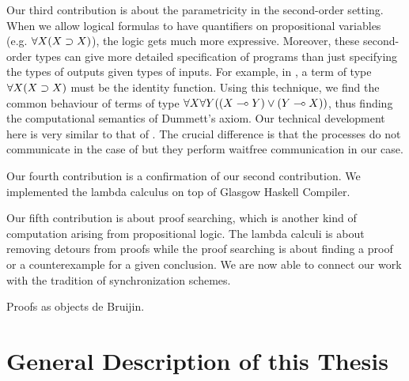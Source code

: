 Our third contribution is about the parametricity in the second-order
setting.  When we allow logical formulas to have quantifiers on
propositional variables (e.g. $\forall X(X\supset X)$), the logic gets much
more expressive.
Moreover, these second-order types can give more detailed specification
of programs than just specifying the types of outputs given types of
inputs.
For example, in , a term of type $\forall X(X\supset X)$
must be the identity function.
Using this technique, we find the common behaviour of terms of type
$\forall X \forall Y ((X\multimap Y)\lor (Y\multimap X))$, thus finding the
computational semantics of Dummett's axiom.
Our technical development here is very similar to that of
\citet{danos-krivine}.  The crucial difference is that the processes do
not communicate in the case of \citet{danos-krivine} but they perform
waitfree communication in our case.

Our fourth contribution is a confirmation of our second contribution.
We implemented the lambda calculus on top of
Glasgow Haskell Compiler.

Our fifth contribution is about proof searching, which is another
kind of computation arising from propositional logic.
The lambda calculi is about removing detours from proofs while the proof
searching is about finding a proof or a counterexample for a given
conclusion.  
We are now able to connect our work with the tradition of
synchronization schemes.

Proofs as objects de Bruijin.

\section{General Description of this Thesis}




